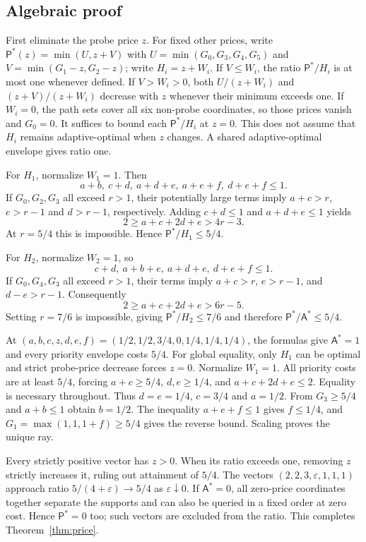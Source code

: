 \documentclass[pdflatex,sn-mathphys-num]{sn-jnl}
\newcommand{\A}{\mathsf{A}}
\newcommand{\Pcost}{\mathsf{P}}
\theoremstyle{thmstyleone}
\theoremstyle{thmstylethree}
\theoremstyle{thmstyletwo}
\begin{document}
\subsection{Algebraic proof}
First eliminate the probe price $z$. For fixed other prices, write $\Pcost^*(z)=\min(U,z+V)$ with $U=\min(G_0,G_3,G_4,G_5)$ and $V=\min(G_1-z,G_2-z)$; write $H_i=z+W_i$. If $V\leq W_i$, the ratio $\Pcost^*/H_i$ is at most one whenever defined. If $V>W_i>0$, both $U/(z+W_i)$ and $(z+V)/(z+W_i)$ decrease with $z$ whenever their minimum exceeds one. If $W_i=0$, the path sets cover all six non-probe coordinates, so those prices vanish and $G_0=0$. It suffices to bound each $\Pcost^*/H_i$ at $z=0$. This does not assume that $H_i$ remains adaptive-optimal when $z$ changes. A shared adaptive-optimal envelope gives ratio one.

For $H_1$, normalize $W_1=1$. Then
\[
a+b,\ c+d,\ a+d+e,\ a+e+f,\ d+e+f\leq1.
\]
If $G_0,G_2,G_3$ all exceed $r>1$, their potentially large terms imply $a+c>r$, $e>r-1$ and $d>r-1$, respectively. Adding $c+d\leq1$ and $a+d+e\leq1$ yields
\[
2\geq a+c+2d+e>4r-3.
\]
At $r=5/4$ this is impossible. Hence $\Pcost^*/H_1\leq5/4$.

For $H_2$, normalize $W_2=1$, so
\[
c+d,\ a+b+e,\ a+d+e,\ d+e+f\leq1.
\]
If $G_0,G_4,G_3$ all exceed $r>1$, their terms imply $a+c>r$, $e>r-1$, and $d-e>r-1$. Consequently
\[
2\geq a+c+2d+e>6r-5.
\]
Setting $r=7/6$ is impossible, giving $\Pcost^*/H_2\leq7/6$ and therefore $\Pcost^*/\A^*\leq5/4$.

At $(a,b,c,z,d,e,f)=(1/2,1/2,3/4,0,1/4,1/4,1/4)$, the formulas give $\A^*=1$ and every priority envelope costs $5/4$. For global equality, only $H_1$ can be optimal and strict probe-price decrease forces $z=0$. Normalize $W_1=1$. All priority costs are at least $5/4$, forcing $a+c\geq5/4$, $d,e\geq1/4$, and $a+c+2d+e\leq2$. Equality is necessary throughout. Thus $d=e=1/4$, $c=3/4$ and $a=1/2$. From $G_3\geq5/4$ and $a+b\leq1$ obtain $b=1/2$. The inequality $a+e+f\leq1$ gives $f\leq1/4$, and $G_1=\max(1,1,1+f)\geq5/4$ gives the reverse bound. Scaling proves the unique ray.

Every strictly positive vector has $z>0$. When its ratio exceeds one, removing $z$ strictly increases it, ruling out attainment of $5/4$. The vectors $(2,2,3,\varepsilon,1,1,1)$ approach ratio $5/(4+\varepsilon)\to5/4$ as $\varepsilon\downarrow0$. If $\A^*=0$, all zero-price coordinates together separate the supports and can also be queried in a fixed order at zero cost. Hence $\Pcost^*=0$ too; such vectors are excluded from the ratio. This completes Theorem~\ref{thm:price}.
\end{document}

